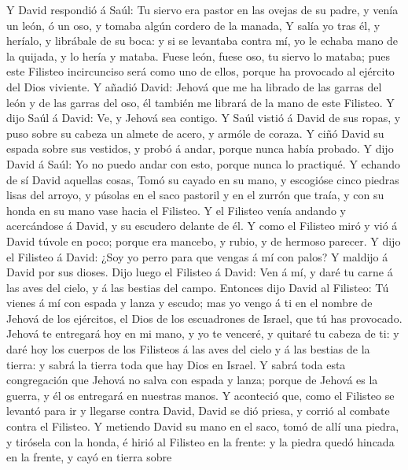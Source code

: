 Y David respondió á Saúl: Tu siervo era pastor en las
ovejas de su padre, y venía un león, ó un oso, y tomaba algún cordero de
la manada,  Y salía yo tras él, y heríalo, y librábale de
su boca: y si se levantaba contra mí, yo le echaba mano de la quijada, y
lo hería y mataba.  Fuese león, fuese oso, tu siervo lo
mataba; pues este Filisteo incircunciso será como uno de ellos, porque
ha provocado al ejército del Dios viviente.  Y añadió
David: Jehová que me ha librado de las garras del león y de las garras
del oso, él también me librará de la mano de este Filisteo. Y dijo Saúl
á David: Ve, y Jehová sea contigo.  Y Saúl vistió á David
de sus ropas, y puso sobre su cabeza un almete de acero, y armóle de
coraza.  Y ciñó David su espada sobre sus vestidos, y
probó á andar, porque nunca había probado. Y dijo David á Saúl: Yo no
puedo andar con esto, porque nunca lo practiqué. Y echando de sí David
aquellas cosas,  Tomó su cayado en su mano, y escogióse
cinco piedras lisas del arroyo, y púsolas en el saco pastoril y en el
zurrón que traía, y con su honda en su mano vase hacia el Filisteo.
 Y el Filisteo venía andando y acercándose á David, y su
escudero delante de él.  Y como el Filisteo miró y vió á
David túvole en poco; porque era mancebo, y rubio, y de hermoso parecer.
 Y dijo el Filisteo á David: ¿Soy yo perro para que
vengas á mí con palos? Y maldijo á David por sus dioses. 
Dijo luego el Filisteo á David: Ven á mí, y daré tu carne á las aves del
cielo, y á las bestias del campo.  Entonces dijo David al
Filisteo: Tú vienes á mí con espada y lanza y escudo; mas yo vengo á ti
en el nombre de Jehová de los ejércitos, el Dios de los escuadrones de
Israel, que tú has provocado.  Jehová te entregará hoy en
mi mano, y yo te venceré, y quitaré tu cabeza de ti: y daré hoy los
cuerpos de los Filisteos á las aves del cielo y á las bestias de la
tierra: y sabrá la tierra toda que hay Dios en Israel.  Y
sabrá toda esta congregación que Jehová no salva con espada y lanza;
porque de Jehová es la guerra, y él os entregará en nuestras manos.
 Y aconteció que, como el Filisteo se levantó para ir y
llegarse contra David, David se dió priesa, y corrió al combate contra
el Filisteo.  Y metiendo David su mano en el saco, tomó
de allí una piedra, y tirósela con la honda, é hirió al Filisteo en la
frente: y la piedra quedó hincada en la frente, y cayó en tierra sobre
